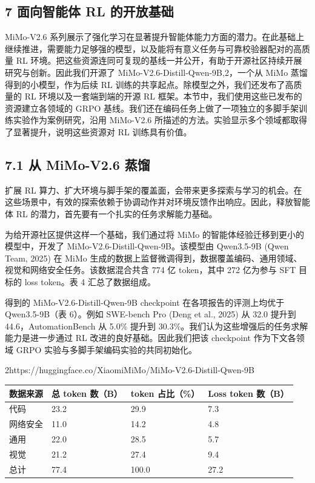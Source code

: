 \subsection{7 面向智能体 RL 的开放基础}\label{open-foundations-for-agentic-rl}

MiMo-V2.6 系列展示了强化学习在显著提升智能体能力方面的潜力。在此基础上继续推进，需要能力足够强的模型，以及能将有意义任务与可靠校验器配对的高质量 RL 环境。把这些资源连同可复现的基线一并公开，有助于开源社区持续开展研究与创新。因此我们开源了 MiMo-V2.6-Distill-Qwen-9B,2，一个从 MiMo 蒸馏得到的小模型，作为后续 RL 训练的共享起点。除模型之外，我们还发布了高质量的 RL 环境以及一套端到端的开源 RL 框架。本节中，我们使用这些已发布的资源建立各领域的 GRPO 基线。我们还在编码任务上做了一项独立的多脚手架训练实验作为案例研究，沿用 MiMo-V2.6 所描述的方法。实验显示多个领域都取得了显著提升，说明这些资源对 RL 训练具有价值。

\subsection{7.1 从 MiMo-V2.6 蒸馏}\label{distillation-from-mimo-v2.6}

扩展 RL 算力、扩大环境与脚手架的覆盖面，会带来更多探索与学习的机会。在这些场景中，有效的探索依赖于协调动作并对环境反馈作出响应。因此，释放智能体 RL 的潜力，首先要有一个扎实的任务求解能力基础。

为给开源社区提供这样一个基础，我们通过将 MiMo 的智能体经验迁移到更小的模型中，开发了 MiMo-V2.6-Distill-Qwen-9B。该模型由 Qwen3.5-9B (Qwen Team, 2025) 在 MiMo 生成的数据上监督微调得到，数据覆盖编码、通用领域、视觉和网络安全任务。该数据混合共含 774 亿 token，其中 272 亿为参与 SFT 目标的 loss token。表 4 汇总了数据组成。

得到的 MiMo-V2.6-Distill-Qwen-9B checkpoint 在各项报告的评测上均优于 Qwen3.5-9B（表 6）。例如 SWE-bench Pro (Deng et al., 2025) 从 32.0 提升到 44.6，AutomationBench 从 5.0\% 提升到 30.3\%。我们认为这些增强后的任务求解能力是进一步通过 RL 改进的良好基础。因此我们把该 checkpoint 作为下文各领域 GRPO 实验与多脚手架编码实验的共同初始化。

2https://huggingface.co/XiaomiMiMo/MiMo-V2.6-Distill-Qwen-9B



{\def\LTcaptype{none} %
\begin{longtable}[]{@{}|l|l|l|l|@{}}
\toprule\noalign{}
\endhead
\bottomrule\noalign{}
\endlastfoot
\hline
数据来源 & 总 token 数（B） & token 占比（\%） & Loss token 数（B） \\
\hline
代码 & 23.2 & 29.9 & 7.3 \\
\hline
网络安全 & 11.0 & 14.2 & 4.8 \\
\hline
通用 & 22.0 & 28.5 & 5.7 \\
\hline
视觉 & 21.2 & 27.4 & 9.4 \\
\hline
总计 & 77.4 & 100.0 & 27.2 \\
\hline
\end{longtable}
}

